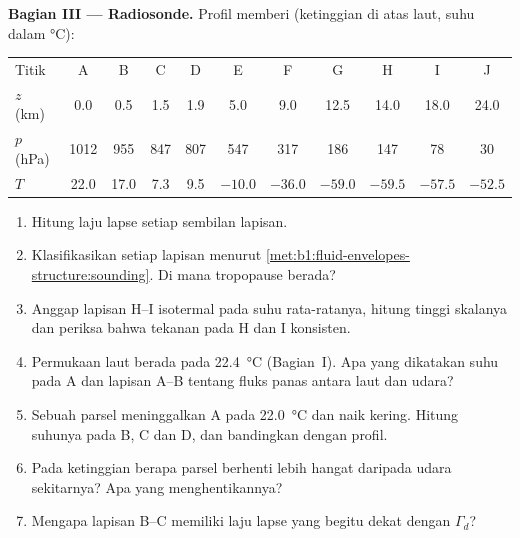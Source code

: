 \begin{problem}
\medskip
\noindent\textbf{Bagian III --- Radiosonde.} Profil memberi (ketinggian di atas laut,
suhu dalam \si{\celsius}):
\begin{center}
\small
\setlength{\tabcolsep}{4pt}
\begin{tabular}{|l|cccccccccc|}
\hline
Titik & A & B & C & D & E & F & G & H & I & J \\
$z$ (km) & 0.0 & 0.5 & 1.5 & 1.9 & 5.0 & 9.0 & 12.5 & 14.0 & 18.0 & 24.0 \\
$p$ (hPa) & 1012 & 955 & 847 & 807 & 547 & 317 & 186 & 147 & 78 & 30 \\
$T$ & 22.0 & 17.0 & 7.3 & 9.5 & $-10.0$ & $-36.0$ & $-59.0$ & $-59.5$ & $-57.5$ & $-52.5$ \\
\hline
\end{tabular}
\end{center}
\begin{enumerate}[resume]
  \item Hitung laju lapse setiap sembilan lapisan.
  \item Klasifikasikan setiap lapisan menurut \cref{met:b1:fluid-envelopes-structure:sounding}.
        Di mana tropopause berada?
  \item Anggap lapisan H--I isotermal pada suhu rata-ratanya, hitung tinggi skalanya dan
        periksa bahwa tekanan pada H dan I konsisten.
  \item Permukaan laut berada pada \qty{22.4}{\celsius} (Bagian~I). Apa yang dikatakan
        suhu pada A dan lapisan A--B tentang fluks panas antara laut dan udara?
  \item Sebuah parsel meninggalkan A pada \qty{22.0}{\celsius} dan naik kering. Hitung
        suhunya pada B, C dan D, dan bandingkan dengan profil.
  \item Pada ketinggian berapa parsel berhenti lebih hangat daripada udara sekitarnya?
        Apa yang menghentikannya?
  \item Mengapa lapisan B--C memiliki laju lapse yang begitu dekat dengan $\Gamma_d$?
\end{enumerate}


\end{problem}
